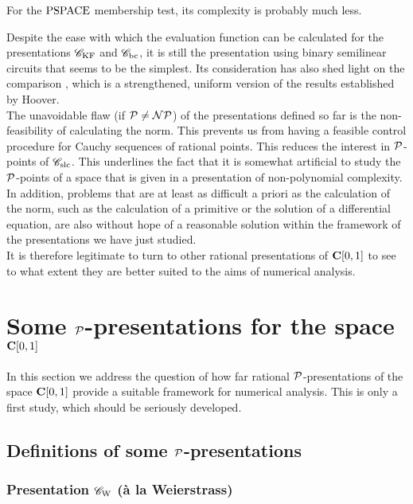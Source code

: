 \bni For the ${\rm PSPACE}$ membership test, its complexity is probably much less.

\begin{remark}\label{444}
Despite the ease with which the evaluation function can be calculated for the presentations ${{{\mathscr C}}_{\rm KF}}$ and ${{{\mathscr C}}_{\rm bc}}$, it is still the presentation using binary semilinear circuits that seems to be the simplest. 
Its consideration has also shed light on the comparison , which is a strengthened, uniform version of the results established by Hoover. 
\\ 
The unavoidable flaw (if ${\cal P} \neq {\cal NP}$) of the presentations defined so far is the non-feasibility of calculating the norm. 
This prevents us from having a feasible control procedure for Cauchy sequences of rational points. 
This reduces the interest in ${\cal P}$-points of ${{{\mathscr C}}_{\rm slc}}$. 
This underlines the fact that it is somewhat artificial to study the ${\cal P}$-points of a space that is given in a presentation of non-polynomial complexity.\\
In addition, problems that are at least as difficult a priori as the calculation of the norm, such as the calculation of a primitive or the solution of a differential equation, are also without hope of a reasonable solution within the framework of the presentations we have just studied.
\\ 
It is therefore legitimate to turn to other rational presentations of ${{\bf C}[0,1]}$  to see to what extent they are better suited to the aims of numerical analysis.
\end{remark}




\section{Some  \texorpdfstring{${\cal P}$}{P}-presentations 
for the space \texorpdfstring{${{\bf C}[0,1]}$}{C[0,1]}}\label{sec5}

In this section we address the question of how far rational ${\cal P}$-presentations  of the space ${{\bf C}[0,1]}$ provide a suitable framework for numerical analysis. This is only a first study, which should be seriously developed.

\subsection{Definitions of some ${\cal P}$-presentations}\label{subsec51}

\subsubsection{Presentation \texorpdfstring{${{{\mathscr C}}_{\rm W}}$}{Cw}
 (à la Weierstrass)}\label{subsubsec511}

